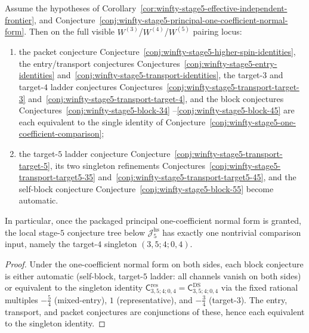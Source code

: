 \begin{corollary}
\label{cor:winfty-stage5-visible-conjecture-network-collapse}
Assume the hypotheses of
Corollary~\ref{cor:winfty-stage5-effective-independent-frontier},
and
Conjecture~\ref{conj:winfty-stage5-principal-one-coefficient-normal-form}.
Then on the full visible
\texorpdfstring{$W^{(3)}$}{W3}/\texorpdfstring{$W^{(4)}$}{W4}/\texorpdfstring{$W^{(5)}$}{W5}
pairing locus:
\begin{enumerate}[label=\textup{(\roman*)}]
\item the packet conjecture
  Conjecture~\ref{conj:winfty-stage5-higher-spin-identities}, the
  entry/transport conjectures
  Conjectures~\ref{conj:winfty-stage5-entry-identities}
  and~\ref{conj:winfty-stage5-transport-identities}, the target-$3$ and
  target-$4$ ladder conjectures
  Conjectures~\ref{conj:winfty-stage5-transport-target-3}
  and~\ref{conj:winfty-stage5-transport-target-4}, and the block
  conjectures
  Conjectures~\ref{conj:winfty-stage5-block-34}
  --\ref{conj:winfty-stage5-block-45} are each equivalent to the single
  identity of
  Conjecture~\ref{conj:winfty-stage5-one-coefficient-comparison};
\item the target-$5$ ladder conjecture
  Conjecture~\ref{conj:winfty-stage5-transport-target-5}, its two
  singleton refinements
  Conjectures~\ref{conj:winfty-stage5-transport-target5-35}
  and~\ref{conj:winfty-stage5-transport-target5-45}, and the self-block
  conjecture
  Conjecture~\ref{conj:winfty-stage5-block-55} become automatic.
\end{enumerate}
In particular, once the packaged principal one-coefficient normal form
is granted, the local stage-$5$ conjecture tree below
\(\mathcal{J}_5^{\mathrm{hs}}\) has exactly one nontrivial comparison
input, namely the target-$4$ singleton \((3,5;4;0,4)\).
\end{corollary}

\begin{proof}
Under the one-coefficient normal form on both sides, each block conjecture is either automatic (self-block, target-$5$ ladder: all channels vanish on both sides) or equivalent to the singleton identity \(\mathsf{C}^{\mathrm{res}}_{3,5;4;0,4}=\mathsf{C}^{\mathrm{DS}}_{3,5;4;0,4}\) via the fixed rational multiples \(-\tfrac54\) (mixed-entry), \(1\) (representative), and \(-\tfrac34\) (target-$3$).  The entry, transport, and packet conjectures are conjunctions of these, hence each equivalent to the singleton identity.
\end{proof}

